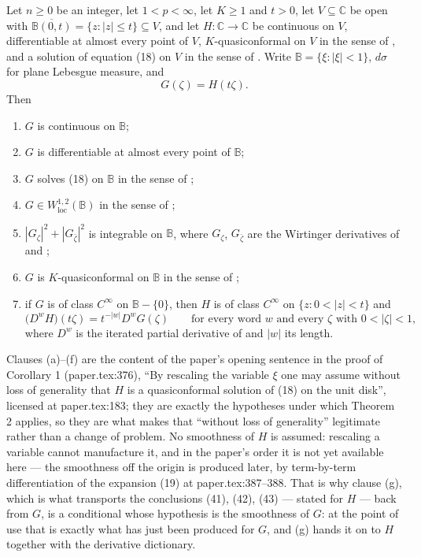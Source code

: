 \begin{lemma}
Let $n\ge0$ be an integer, let $1<p<\infty$, let $K\ge1$ and $t>0$, let
$V\subseteq\mathbb{C}$ be open with
$\overline{\mathbb{B}(0,t)}=\{z:|z|\le t\}\subseteq V$, and let
$H\colon\mathbb{C}\to\mathbb{C}$ be continuous on $V$, differentiable at almost
every point of $V$, $K$-quasiconformal on $V$ in the sense of
, and a solution of equation (18) on $V$ in the sense
of .  Write $\mathbb{B}=\{\xi:|\xi|<1\}$, $d\sigma$ for
plane Lebesgue measure, and
\[
  G(\zeta)=H(t\zeta).
\]
Then
\begin{enumerate}
\item[(a)] $G$ is continuous on $\mathbb{B}$;
\item[(b)] $G$ is differentiable at almost every point of $\mathbb{B}$;
\item[(c)] $G$ solves (18) on $\mathbb{B}$ in the sense of
  ;
\item[(d)] $G\in W^{1,2}_{\mathrm{loc}}(\mathbb{B})$ in the sense of
  ;
\item[(e)] $|G_\zeta|^2+|G_{\bar\zeta}|^2$ is integrable on $\mathbb{B}$, where
  $G_\zeta$, $G_{\bar\zeta}$ are the Wirtinger derivatives of  and
  ;
\item[(f)] $G$ is $K$-quasiconformal on $\mathbb{B}$ in the sense of
  ;
\item[(g)] if $G$ is of class $C^\infty$ on $\mathbb{B}-\{0\}$, then $H$ is of
  class $C^\infty$ on $\{z:0<|z|<t\}$ and
\[
  \bigl(D^{w}H\bigr)(t\zeta)=t^{-|w|}D^{w}G(\zeta)
  \qquad\text{for every word }w\text{ and every }\zeta\text{ with }0<|\zeta|<1,
\]
where $D^{w}$ is the iterated partial derivative of  and
$|w|$ its length.
\end{enumerate}

Clauses (a)--(f) are the content of the paper's opening sentence in the proof
of Corollary 1 (paper.tex:376), ``By rescaling the variable $\xi$ one may
assume without loss of generality that $H$ is a quasiconformal solution of
(18) on the unit disk'', licensed at paper.tex:183; they are exactly the
hypotheses under which Theorem 2 applies, so they are what makes that
``without loss of generality'' legitimate rather than a change of problem.
No smoothness of $H$ is assumed: rescaling a variable cannot manufacture it,
and in the paper's order it is not yet available here --- the smoothness off
the origin is produced later, by term-by-term differentiation of the expansion
(19) at paper.tex:387--388.  That is why clause (g), which is what transports
the conclusions (41), (42), (43) --- stated for $H$ --- back from $G$, is a
conditional whose hypothesis is the smoothness of $G$: at the point of use that
is exactly what has just been produced for $G$, and (g) hands it on to $H$
together with the derivative dictionary.
\end{lemma}
